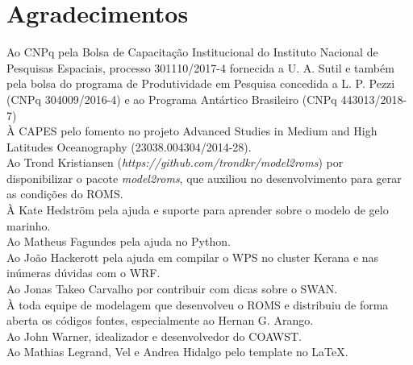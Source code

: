 \chapter*{Agradecimentos}




\noindent Ao CNPq pela Bolsa de Capacitação Institucional do Instituto Nacional de Pesquisas Espaciais, processo 301110/2017-4 
          fornecida a U. A. Sutil e também pela bolsa do programa de Produtividade em Pesquisa concedida a
          L. P. Pezzi (CNPq 304009/2016-4) e ao Programa Antártico Brasileiro (CNPq 443013/2018-7) \\

\noindent À CAPES pelo fomento no projeto Advanced Studies in Medium and High Latitudes Oceanography (23038.004304/2014-28). \\

\noindent Ao Trond Kristiansen (\textcolor{bleu_cite}{\textit{https://github.com/trondkr/model2roms}}) por disponibilizar o 
          pacote \textit{model2roms}, que auxiliou no desenvolvimento para gerar as condições do ROMS. \\

\noindent À Kate Hedström pela ajuda e suporte para aprender sobre o modelo de gelo marinho. \\

\noindent Ao Matheus Fagundes pela ajuda no Python. \\

\noindent Ao João Hackerott pela ajuda em compilar o WPS no cluster Kerana e nas inúmeras dúvidas com o WRF. \\

\noindent Ao Jonas Takeo Carvalho por contribuir com dicas sobre o SWAN. \\

\noindent À toda equipe de modelagem que desenvolveu o ROMS e distribuiu de forma aberta os códigos fontes, 
          especialmente ao Hernan G. Arango.\\

\noindent Ao John Warner, idealizador e desenvolvedor do COAWST. \\

\noindent Ao Mathias Legrand, Vel e Andrea Hidalgo pelo template no \LaTeX.
